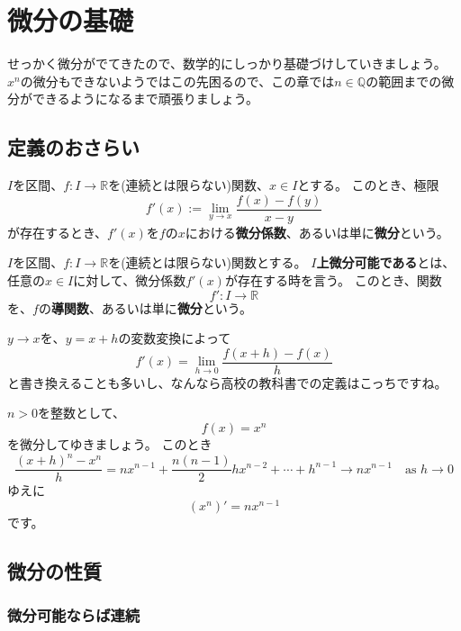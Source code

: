 \chapter{微分の基礎}

せっかく微分がでてきたので、数学的にしっかり基礎づけしていきましょう。
$x^n$の微分もできないようではこの先困るので、この章では$n\in\mathbb{Q}$の範囲までの微分ができるようになるまで頑張りましょう。



\section{定義のおさらい}

\begin{definition}
  $I$を区間、$f:I\to\mathbb{R}$を(連続とは限らない)関数、$x\in I$とする。
  このとき、極限
  \[
    f'(x):=\lim_{y\to x}\frac{f(x)-f(y)}{x-y}
  \]
  が存在するとき、$f'(x)$を$f$の$x$における\textbf{微分係数}、あるいは単に\textbf{微分}という。
\end{definition}

\begin{definition}
  $I$を区間、$f:I\to\mathbb{R}$を(連続とは限らない)関数とする。
  \textbf{$I$上微分可能である}とは、任意の$x\in I$に対して、微分係数$f'(x)$が存在する時を言う。
  このとき、関数
  \[
    f':I\to\mathbb{R}
  \]
  を、$f$の\textbf{導関数}、あるいは単に\textbf{微分}という。
\end{definition}

$y\to x$を、$y=x+h$の変数変換によって
\[
  f'(x)=\lim_{h\to0}\frac{f(x+h)-f(x)}{h}
\]
と書き換えることも多いし、なんなら高校の教科書での定義はこっちですね。

\begin{example}
  $n>0$を整数として、
  \[
    f(x)=x^n
  \]
  を微分してゆきましょう。
  このとき
  \[
    \frac{(x+h)^n-x^n}{h}=nx^{n-1}+\frac{n(n-1)}{2}hx^{n-2}+\cdots+h^{n-1}\to nx^{n-1}\quad\text{as }h\to 0
  \]
  ゆえに
  \[
    (x^n)'=nx^{n-1}
  \]
  です。
\end{example}



\section{微分の性質}

\subsection{微分可能ならば連続}

